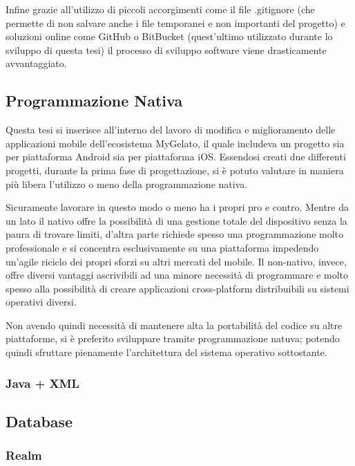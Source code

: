 Infine grazie all'utilizzo di piccoli accorgimenti come il file .gitignore (che permette di non salvare anche i file temporanei e non importanti del progetto) e soluzioni online come GitHub o BitBucket (quest'ultimo utilizzato durante lo sviluppo di questa tesi) il processo di sviluppo software viene drasticamente avvantaggiato.

\subsection{Programmazione Nativa}
Questa tesi si inserisce all'interno del lavoro di modifica e miglioramento delle applicazioni mobile dell'ecosistema MyGelato, il quale includeva un progetto sia per piattaforma Android sia per piattaforma iOS.
Essendosi creati due differenti progetti, durante la prima fase di progettazione, si è potuto valutare in maniera più libera l'utilizzo o meno della programmazione nativa.

Sicuramente lavorare in questo modo o meno ha i propri pro e contro. Mentre da un lato il nativo offre la possibilità di una gestione totale del dispositivo senza la paura di trovare limiti, d’altra parte richiede spesso una programmazione molto professionale e si concentra esclusivamente su una piattaforma impedendo un’agile riciclo dei propri sforzi su altri mercati del mobile. 
Il non-nativo, invece, offre diversi vantaggi ascrivibili ad una minore necessità di programmare e molto spesso alla possibilità di creare applicazioni cross-platform distribuibili su sistemi operativi diversi.\autocite{HTMLIT:PROG_NATIVA}

Non avendo quindi necessità di mantenere alta la portabilità del codice su altre piattaforme, si è preferito sviluppare tramite programmazione natuva; potendo quindi sfruttare pienamente l'architettura del sistema operativo sottostante.

\subsubsection{Java + XML}

\subsection{Database}


\subsubsection{Realm}

